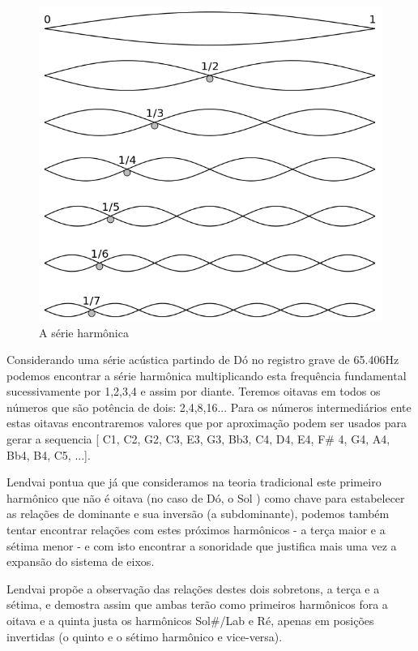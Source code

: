 \documentclass[
	12pt,				%
	openright,			%
	twoside,			%
	a4paper,			%
	english,			%
	french,				%
	spanish,			%
	brazil				%
	]{abntex2}
\begin{document}
\begin{figure}[!h]
	\caption{\label{fig_grafico}A série harmônica }
	\begin{center}
	    \includegraphics[scale=0.3]{axis/serie_harmonica.png}
	\end{center}
\end{figure}

Considerando uma série acústica partindo de Dó no registro grave de 65.406Hz podemos encontrar a série harmônica multiplicando esta frequência fundamental sucessivamente por 1,2,3,4 e assim por diante. Teremos oitavas em todos os números que são potência de dois: 2,4,8,16... Para os números intermediários ente estas oitavas encontraremos valores que por aproximação podem ser usados para gerar a sequencia [ C1, C2, G2, C3, E3, G3, Bb3, C4, D4, E4, F\# 4, G4, A4, Bb4, B4, C5, ...].

Lendvai pontua que já que consideramos na teoria tradicional este primeiro harmônico que não é oitava (no caso de Dó, o Sol ) como chave para estabelecer as relações de dominante e sua inversão (a subdominante), podemos também tentar encontrar relações com estes próximos harmônicos - a terça maior e a sétima menor - e com isto encontrar a sonoridade que justifica mais uma vez a expansão do sistema de eixos.

Lendvai propõe a observação das relações destes dois sobretons, a terça e a sétima, e demostra assim que ambas terão como primeiros harmônicos fora a oitava e a quinta justa os harmônicos Sol\#/Lab e Ré, apenas em posições invertidas (o quinto e o sétimo harmônico e vice-versa).
\end{document}
